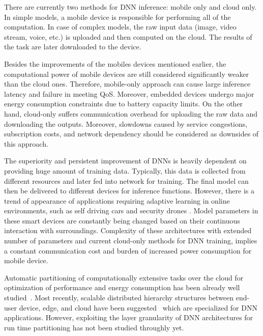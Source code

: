 There are currently two methods for DNN inference: mobile only and cloud only. In simple models, a mobile device is responsible for performing all of the computation. In case of complex models, the raw input data (image, video stream, voice, etc.) is uploaded and then computed on the cloud. The results of the task are later downloaded to the device. 

Besides the improvements of the mobiles devices mentioned earlier, the computational power of mobile devices are still considered significantly weaker than the cloud ones. Therefore, mobile-only approach can cause large inference latency and failure in meeting QoS. Moreover, embedded devices undergo major energy consumption constraints due to battery capacity limits. On the other hand, cloud-only suffers communication overhead for uploading the raw data and downloading the outputs. Moreover, slowdowns caused by service congestions, subscription costs, and network dependency should be considered as downsides of this approach. 

The superiority and persistent improvement of DNNs is heavily dependent on providing huge amount of training data. Typically, this data is collected from different resources and later fed into network for training. The final model can then be delivered to different devices for inference functions. However, there is a trend of appearance of applications requiring adaptive learning in online environments, such as self driving cars and security drones \cite{AdaptiveCar}\cite{EASI}. Model parameters in these smart devices are constantly being changed based on their continuous interaction with surroundings. Complexity of these architectures with extended number of parameters and current cloud-only methods for DNN training, implies a constant communication cost and burden of increased power consumption for mobile device. 

Automatic partitioning of computationally extensive tasks over the cloud for optimization of performance and energy consumption has been already well studied~\cite{CloneCloud}. Most recently, scalable distributed hierarchy structures between end-user device, edge, and cloud have been suggested~\cite{CloudEdgeDevice} which are specialized for DNN applications. However, exploiting the layer granularity of DNN architectures for run time partitioning has not been studied throughly yet. 



